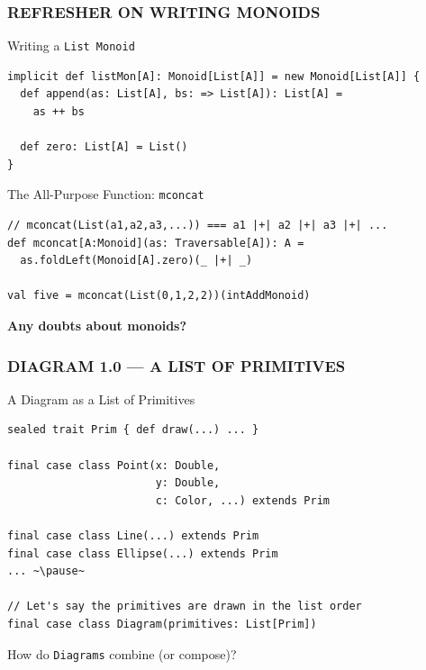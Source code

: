 \documentclass{beamer}
\begin{document}
\begin{frame}[fragile] \frametitle{REFRESHER ON WRITING MONOIDS}
  \begin{block}{Writing a \texttt{List Monoid}}
  \begin{lstlisting}
implicit def listMon[A]: Monoid[List[A]] = new Monoid[List[A]] {
  def append(as: List[A], bs: => List[A]): List[A] =
    as ++ bs

  def zero: List[A] = List()
}
  \end{lstlisting}
  \vspace{-.5cm}
  \end{block}

  \vspace{-.1cm}

  \begin{block}{The All-Purpose Function: \texttt{mconcat}}
  \begin{lstlisting}
// mconcat(List(a1,a2,a3,...)) === a1 |+| a2 |+| a3 |+| ...
def mconcat[A:Monoid](as: Traversable[A]): A =
  as.foldLeft(Monoid[A].zero)(_ |+| _)

val five = mconcat(List(0,1,2,2))(intAddMonoid)
  \end{lstlisting}
  \vspace{-.5cm}
  \end{block}

  \vspace{-.1cm}

  \begin{block}{}
    \centering
    \bf
    Any doubts about monoids?
  \end{block}

\end{frame}

\begin{frame}[fragile] \frametitle{DIAGRAM 1.0 --- A LIST OF PRIMITIVES}
  \begin{block}{A Diagram as a List of Primitives}
  \begin{lstlisting}
sealed trait Prim { def draw(...) ... }

final case class Point(x: Double,
                       y: Double,
                       c: Color, ...) extends Prim

final case class Line(...) extends Prim
final case class Ellipse(...) extends Prim
... ~\pause~

// Let's say the primitives are drawn in the list order
final case class Diagram(primitives: List[Prim])
  \end{lstlisting}
  \end{block}

  How do \texttt{Diagrams} combine (or compose)?
\end{frame}
\end{document}
